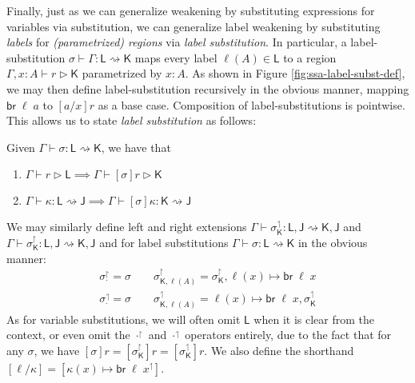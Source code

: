 \documentclass[acmsmall,screen,review]{acmart}
\newcommand{\ms}[1]{\ensuremath{\mathsf{#1}}}
\newcommand{\brb}[2]{\ms{br}\;#1\;#2}
\newcommand{\rupg}[1]{{#1}^\upharpoonright}
\newcommand{\lupg}[1]{{#1}^\upharpoonleft}
\newcommand{\haslb}[3]{#1 \vdash #2 \rhd #3}
\newcommand{\lbsubst}[4]{#1 \vdash #2: #3 \rightsquigarrow #4}
\begin{document}
Finally, just as we can generalize weakening by substituting expressions for variables via
substitution, we can generalize label weakening by substituting \emph{labels} for
\emph{(parametrized) regions} via \emph{label substitution}. In particular, a label-substitution
$\lbsubst{\sigma}{\Gamma}{\ms{L}}{\ms{K}}$ maps every label $\ell(A) \in \ms{L}$ to a region
$\haslb{\Gamma, x : A}{r}{\ms{K}}$ parametrized by $x : A$. As shown in Figure
\ref{fig:ssa-label-subst-def}, we may then define label-substitution recursively in the obvious
manner, mapping $\ms{br}\;\ell\;a$ to $[a/x]r$ as a base case. Composition of label-substitutions is
pointwise. This allows us to state \emph{label substitution} as follows:

\begin{lemma}
  Given $\lbsubst{\Gamma}{\sigma}{\ms{L}}{\ms{K}}$, we have that
  \begin{enumerate}[label=(\alph*)]
    \item $\haslb{\Gamma}{r}{\ms{L}} \implies \haslb{\Gamma}{[\sigma]r}{\ms{K}}$
    \item $\lbsubst{\Gamma}{\kappa}{\ms{L}}{\ms{J}} 
      \implies \lbsubst{\Gamma}{[\sigma]\kappa}{\ms{K}}{\ms{J}}$
  \end{enumerate}
\end{lemma}

We may similarly define left and right extensions $\lbsubst{\Gamma}{\lupg{\sigma}_{\ms{K}}}{\ms{L},
\ms{J}}{\ms{K}, \ms{J}}$ and $\lbsubst{\Gamma}{\rupg{\sigma}_{\ms{K}}}{\ms{L}, \ms{J}}{\ms{K},
\ms{J}}$ and for label substitutions $\lbsubst{\Gamma}{\sigma}{\ms{L}}{\ms{K}}$ in the obvious
manner:
\begin{gather}
  \rupg{\sigma}_{\cdot} = \sigma \qquad 
  \rupg{\sigma}_{\ms{K}, \ell(A)} = \rupg{\sigma}_{\ms{K}}, \ell(x) \mapsto \brb{\ell}{x} \\
  \lupg{\sigma}_{\cdot} = \sigma \qquad
  \lupg{\sigma}_{\ms{K}, \ell(A)} = \ell(x) \mapsto \brb{\ell}{x}, \lupg{\sigma}_{\ms{K}}
\end{gather}
As for variable substitutions, we will often omit $\ms{L}$ when it is clear from the context, or
even omit the $\rupg{\cdot}$ and $\lupg{\cdot}$ operators entirely, due to the fact that for any
$\sigma$, we have $[\sigma]r = [\rupg{\sigma}_{\ms{K}}]r = [\lupg{\sigma}_{\ms{K}}]r$. We also
define the shorthand $[\ell / \kappa] = [\lupg{\kappa(x) \mapsto \brb{\ell}{x}}]$.
\end{document}
